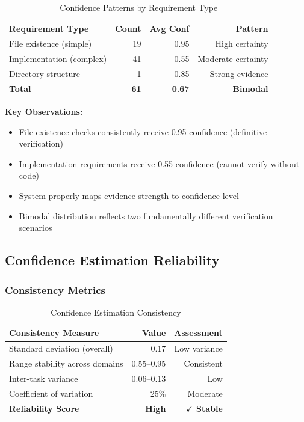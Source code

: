 \documentclass[11pt,a4paper]{article}
\begin{document}
\begin{table}[H]
\centering
\caption{Confidence Patterns by Requirement Type}
\begin{tabular}{lrrr}
\toprule
\textbf{Requirement Type} & \textbf{Count} & \textbf{Avg Conf} & \textbf{Pattern} \\
\midrule
File existence (simple) & 19 & 0.95 & High certainty \\
Implementation (complex) & 41 & 0.55 & Moderate certainty \\
Directory structure & 1 & 0.85 & Strong evidence \\
\midrule
\textbf{Total} & \textbf{61} & \textbf{0.67} & \textbf{Bimodal} \\
\bottomrule
\end{tabular}
\label{tab:requirement-patterns}
\end{table}

\textbf{Key Observations:}
\begin{itemize}[leftmargin=*]
    \item File existence checks consistently receive 0.95 confidence (definitive verification)
    \item Implementation requirements receive 0.55 confidence (cannot verify without code)
    \item System properly maps evidence strength to confidence level
    \item Bimodal distribution reflects two fundamentally different verification scenarios
\end{itemize}

\subsection{Confidence Estimation Reliability}

\subsubsection{Consistency Metrics}

\begin{table}[H]
\centering
\caption{Confidence Estimation Consistency}
\begin{tabular}{lrr}
\toprule
\textbf{Consistency Measure} & \textbf{Value} & \textbf{Assessment} \\
\midrule
Standard deviation (overall) & 0.17 & Low variance \\
Range stability across domains & 0.55--0.95 & Consistent \\
Inter-task variance & 0.06--0.13 & Low \\
Coefficient of variation & 25\% & Moderate \\
\midrule
\textbf{Reliability Score} & \textbf{High} & \textbf{$\checkmark$ Stable} \\
\bottomrule
\end{tabular}
\label{tab:confidence-consistency}
\end{table}
\end{document}
